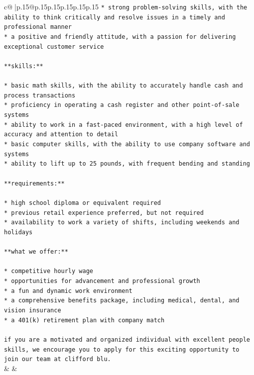 \documentclass{article}
\begin{document}
{\begin{supertabular}{c@{$\;$}|p{.15\linewidth}@{}p{.15\linewidth}p{.15\linewidth}p{.15\linewidth}p{.15\linewidth}p{.15\linewidth}}
{{{\texttt{* strong problem{-}solving skills, with the ability to think critically and resolve issues in a timely and professional manner} \\
\texttt{* a positive and friendly attitude, with a passion for delivering exceptional customer service} \\
\\ 
\texttt{**skills:**} \\
\\ 
\texttt{* basic math skills, with the ability to accurately handle cash and process transactions} \\
\texttt{* proficiency in operating a cash register and other point{-}of{-}sale systems} \\
\texttt{* ability to work in a fast{-}paced environment, with a high level of accuracy and attention to detail} \\
\texttt{* basic computer skills, with the ability to use company software and systems} \\
\texttt{* ability to lift up to 25 pounds, with frequent bending and standing} \\
\\ 
\texttt{**requirements:**} \\
\\ 
\texttt{* high school diploma or equivalent required} \\
\texttt{* previous retail experience preferred, but not required} \\
\texttt{* availability to work a variety of shifts, including weekends and holidays} \\
\\ 
\texttt{**what we offer:**} \\
\\ 
\texttt{* competitive hourly wage} \\
\texttt{* opportunities for advancement and professional growth} \\
\texttt{* a fun and dynamic work environment} \\
\texttt{* a comprehensive benefits package, including medical, dental, and vision insurance} \\
\texttt{* a 401(k) retirement plan with company match} \\
\\ 
\texttt{if you are a motivated and organized individual with excellent people skills, we encourage you to apply for this exciting opportunity to join our team at clifford blu.} \\
            }
        }
    }
    & & \\ \\


\end{supertabular}}
\end{document}
